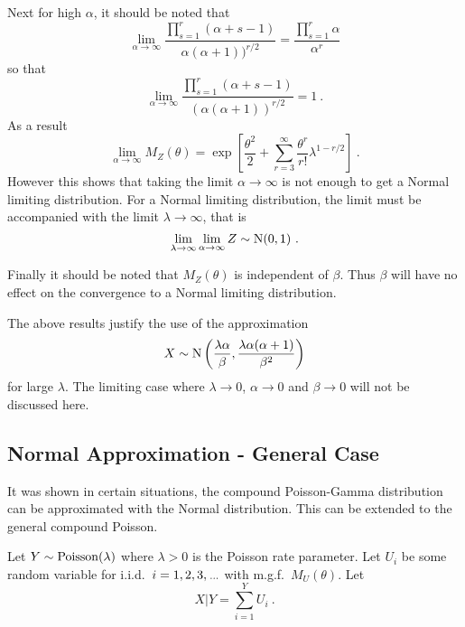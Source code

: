 Next for high $\alpha$, it should be noted that
\begin{equation*}
	\lim_{\alpha\rightarrow\infty}
	\frac{
		\prod_{s=1}^r(\alpha+s-1)
	}
	{
		\alpha(\alpha+1))^{r/2}
	}
	=
	\frac{
		\prod_{s=1}^r\alpha
	}
	{
		\alpha^{r}
	}
\end{equation*}
so that
\begin{equation}
	\lim_{\alpha\rightarrow\infty}
	\frac{
		\prod_{s=1}^r(\alpha+s-1)
	}
	{
		(\alpha(\alpha+1))^{r/2}
	}
	= 1
	\ .
\end{equation}
As a result
\begin{equation}
	\lim_{\alpha\rightarrow\infty}
	M_Z(\theta)=
	\exp\left[
		\frac{\theta^2}{2}
		+\sum_{r=3}^\infty
		\frac{\theta^r}{r!}
		\lambda^{1-r/2}
	\right]
	\ .
\end{equation}
However this shows that taking the limit $\alpha\rightarrow\infty$ is not enough to get a Normal limiting distribution. For a Normal limiting distribution, the limit must be accompanied with the limit $\lambda\rightarrow\infty$, that is
\begin{equation}
	\lim_{\lambda\rightarrow\infty}\lim_{\alpha\rightarrow\infty}Z\sim\operatorname{N}(0,1)
	\ .
\end{equation}

Finally it should be noted that $M_Z(\theta)$ is independent of $\beta$. Thus $\beta$ will have no effect on the convergence to a Normal limiting distribution.

The above results justify the use of the approximation
\begin{equation}
	X\sim\operatorname{N}\left(\frac{\lambda\alpha}{\beta},\frac{\lambda\alpha(\alpha+1)}{\beta^2}\right)
\end{equation}
for large $\lambda$. The limiting case where $\lambda\rightarrow 0$, $\alpha\rightarrow 0$ and $\beta\rightarrow 0$ will not be discussed here.

\subsection{Normal Approximation - General Case}
It was shown in certain situations, the compound Poisson-Gamma distribution can be approximated with the Normal distribution. This can be extended to the general compound Poisson.

Let $Y\sim\operatorname{Poisson}(\lambda)$ where $\lambda>0$ is the Poisson rate parameter. Let $U_i$ be some random variable for i.i.d.~$i=1,2,3,\dotdotdot$ with m.g.f.~$M_U(\theta)$. Let
\begin{equation}
	X|Y = \sum_{i=1}^{Y}U_i
	\ .
\end{equation}

